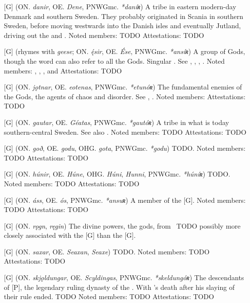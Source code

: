 \begin{itemize}

[G] (ON. \emph{danir}, OE. \emph{Dene}, PNWGmc. \emph{*daníʀ})
  A tribe in eastern modern-day Denmark and southern Sweden. They probably originated in Scania in southern Sweden, before moving westwards into the Danish isles and eventually Jutland, driving out the  and .
  Noted members: TODO
  Attestations: TODO

[G] (rhymes with \emph{geese}; ON. \emph{ę́sir}, OE. \emph{Ése}, PNWGmc. \emph{*ansíʀ})
  A group of Gods, though the word can also refer to all the Gods. Singular . See , , , .
  Noted members: , , ,  and 
  Attestations: TODO

[G] (ON. \emph{jǫtnar}, OE. \emph{eotenas}, PNWGmc. \emph{*etunóʀ})
  The fundamental enemies of the Gods, the agents of chaos and disorder. See , .
  Noted members: 
  Attestations: TODO

[G] (ON. \emph{gautar}, OE. \emph{Géatas}, PNWGmc. \emph{*gautóʀ})
  A tribe in what is today southern-central Sweden. See also .
  Noted members: TODO
  Attestations: TODO

[G] (ON. \emph{goð}, OE. \emph{godu}, OHG. \emph{gota}, PNWGmc. \emph{*godu})
  TODO.
  Noted members: TODO
  Attestations: TODO

[G] (ON. \emph{húnir}, OE. \emph{Húne}, OHG. \emph{Húni}, \emph{Hunni}, PNWGmc. \emph{*húníʀ})
  TODO.
  Noted members: TODO
  Attestations: TODO

[G] (ON. \emph{áss}, OE. \emph{ós}, PNWGmc. \emph{*ansuʀ})
  A member of the [G].
  Noted members: TODO
  Attestations: TODO

[G] (ON. \emph{rǫgn}, \emph{ręgin})
  The divine powers, the gods, from \Vafthrudnismal\ TODO possibly more closely associated with the [G] than the [G].

[G] (ON. \emph{saxar}, OE. \emph{Seaxan}, \emph{Seaxe})
  TODO.
  Noted members: TODO
  Attestations: TODO

[G] (ON. \emph{skjǫldungar}, OE. \emph{Scyldingas}, PNWGmc. \emph{*skeldungóʀ})
  The descendants of [P], the legendary ruling dynasty of the . With 's death after his slaying of  their rule ended. TODO
  Noted members: TODO
  Attestations: TODO


\end{itemize}
